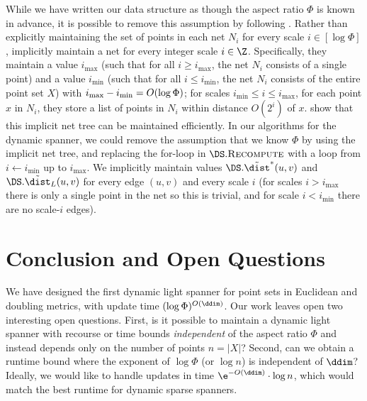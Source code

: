 %
%
\begin{remark}
\label{rem:aspect-ratio}
    While we have written our data structure as though the aspect ratio $\Phi$ is known in advance, it is possible to remove this assumption by following \cite{gao2004deformable}. Rather than explicitly maintaining the set of points in each net $N_i$ for every scale $i \in [\log \Phi]$, \cite{gao2004deformable} implicitly maintain a net for every integer scale $i \in \Z$. 
    Specifically, they maintain a value $i_{\max}$ (such that for all $i \ge i_{\max}$, the net $N_i$ consists of a single point) and a value $i_{\min}$ (such that for all $i \le i_{\min}$, 
    the net $N_i$ consists of the entire point set $X$) with $i_{\max} - i_{\rm min} = O(\log \Phi)$; for scales $i_{\min} \le i \le i_{\max}$, for each point $x$ in $N_i$, they store a list of points in $N_i$ within distance $O(2^i)$ of $x$. \cite{gao2004deformable} show that this implicit net tree can be maintained efficiently.
    In our algorithms for the dynamic spanner, we could remove the assumption that we know $\Phi$ by using the implicit net tree, and replacing the for-loop in $\DS.\textsc{Recompute}$ with a loop from $i\gets i_{\min}$ up to $i_{\max}$. We implicitly maintain values $\DS.\tilde \dist^*(u,v)$ and $\DS.\tilde \dist_L(u,v)$ for every edge $(u,v)$ and every scale $i$ (for scales $i > i_{\max}$ there is only a single point in the net so this is trivial, and for scale $i < i_{\min}$ there are no scale-$i$ edges).
\end{remark}
%
\section{Conclusion and Open Questions}
We have designed the first dynamic light spanner for point sets in Euclidean and doubling metrics, with update time $(\log \Phi)^{O(\ddim)}$. Our work leaves open two interesting open questions. First, is it possible to maintain a dynamic light spanner with recourse or time bounds \emph{independent} of the aspect ratio $\Phi$ and instead depends only on the number of points $n = |X|$? Second, can we obtain a runtime bound where the exponent of $\log \Phi$ (or $\log n$) is independent of $\ddim$? Ideally, we would like to handle updates in time $\e^{-O(\ddim)} \cdot \log n$, which would match the best runtime for dynamic sparse spanners.
%
{
\small
% 
}
%
 \appendix   
%
